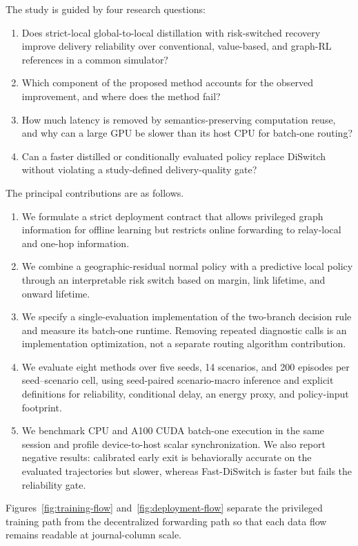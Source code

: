 \documentclass[drones,article,submit,moreauthors]{Definitions/mdpi}
\newcommand{\DS}{DiSwitch}\newcommand{\FastDS}{Fast-DiSwitch}
\begin{document}
The study is guided by four research questions:
\begin{enumerate}[leftmargin=*]
\item Does strict-local global-to-local distillation with risk-switched recovery improve delivery reliability over conventional, value-based, and graph-RL references in a common simulator?
\item Which component of the proposed method accounts for the observed improvement, and where does the method fail?
\item How much latency is removed by semantics-preserving computation reuse, and why can a large GPU be slower than its host CPU for batch-one routing?
\item Can a faster distilled or conditionally evaluated policy replace \DS{} without violating a study-defined delivery-quality gate?
\end{enumerate}

The principal contributions are as follows.
\begin{enumerate}[leftmargin=*]
\item We formulate a strict deployment contract that allows privileged graph information for offline learning but restricts online forwarding to relay-local and one-hop information.
\item We combine a geographic-residual normal policy with a predictive local policy through an interpretable risk switch based on margin, link lifetime, and onward lifetime.
\item We specify a single-evaluation implementation of the two-branch decision rule and measure its batch-one runtime. Removing repeated diagnostic calls is an implementation optimization, not a separate routing algorithm contribution.
\item We evaluate eight methods over five seeds, 14 scenarios, and 200 episodes per seed--scenario cell, using seed-paired scenario-macro inference and explicit definitions for reliability, conditional delay, an energy proxy, and policy-input footprint.
\item We benchmark CPU and A100 CUDA batch-one execution in the same session and profile device-to-host scalar synchronization. We also report negative results: calibrated early exit is behaviorally accurate on the evaluated trajectories but slower, whereas \FastDS{} is faster but fails the reliability gate.
\end{enumerate}

Figures~\ref{fig:training-flow} and~\ref{fig:deployment-flow} separate the privileged training path from the decentralized forwarding path so that each data flow remains readable at journal-column scale.
\end{document}
